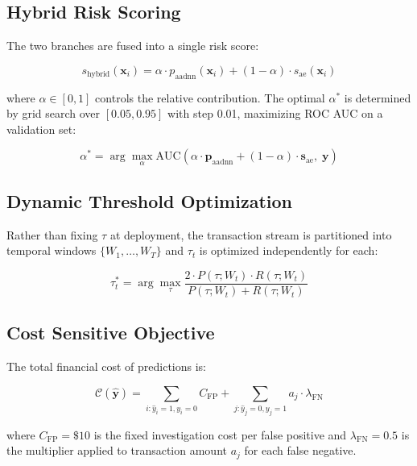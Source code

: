 \documentclass[conference]{IEEEtran}
\begin{document}
\subsection{Hybrid Risk Scoring}

The two branches are fused into a single risk score:

\begin{equation}
s_{\text{hybrid}}(\mathbf{x}_i) = \alpha \cdot p_{\text{aadnn}}(\mathbf{x}_i) + (1-\alpha) \cdot s_{\text{ae}}(\mathbf{x}_i)
\label{eq:hybrid}
\end{equation}

\noindent where $\alpha \in [0, 1]$ controls the relative contribution. The optimal $\alpha^*$ is determined by grid search over $[0.05, 0.95]$ with step 0.01, maximizing ROC AUC on a validation set:

\begin{equation}
\alpha^* = \arg\max_{\alpha} \text{AUC}\!\left(\alpha \cdot \mathbf{p}_{\text{aadnn}} + (1-\alpha) \cdot \mathbf{s}_{\text{ae}}, \; \mathbf{y}\right)
\label{eq:alpha_opt}
\end{equation}

\subsection{Dynamic Threshold Optimization}

Rather than fixing $\tau$ at deployment, the transaction stream is partitioned into temporal windows $\{W_1, \ldots, W_T\}$ and $\tau_t$ is optimized independently for each:

\begin{equation}
\tau_t^* = \arg\max_{\tau} \frac{2 \cdot P(\tau; W_t) \cdot R(\tau; W_t)}{P(\tau; W_t) + R(\tau; W_t)}
\label{eq:dyn}
\end{equation}

\subsection{Cost Sensitive Objective}
\label{sec:cost}

The total financial cost of predictions is:

\begin{equation}
\mathcal{C}(\hat{\mathbf{y}}) = \sum_{i:\hat{y}_i=1,y_i=0} C_{\text{FP}} + \sum_{j:\hat{y}_j=0,y_j=1} a_j \cdot \lambda_{\text{FN}}
\label{eq:cost}
\end{equation}

\noindent where $C_{\text{FP}} = \$10$ is the fixed investigation cost per false positive and $\lambda_{\text{FN}} = 0.5$ is the multiplier applied to transaction amount $a_j$ for each false negative.
\end{document}

